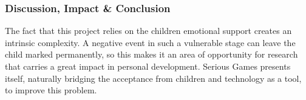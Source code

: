 \documentclass[runningheads]{llncs}
\begin{document}
\subsubsection{Discussion, Impact \& Conclusion}
\par The fact that this project relies on the children emotional support creates an intrinsic complexity. A negative event in such a vulnerable stage can leave the child marked permanently, so this makes it an area of opportunity for research that carries a great impact in personal development. Serious Games presents itself, naturally bridging the acceptance from children and technology as a tool, to improve this problem.

\end{document}
